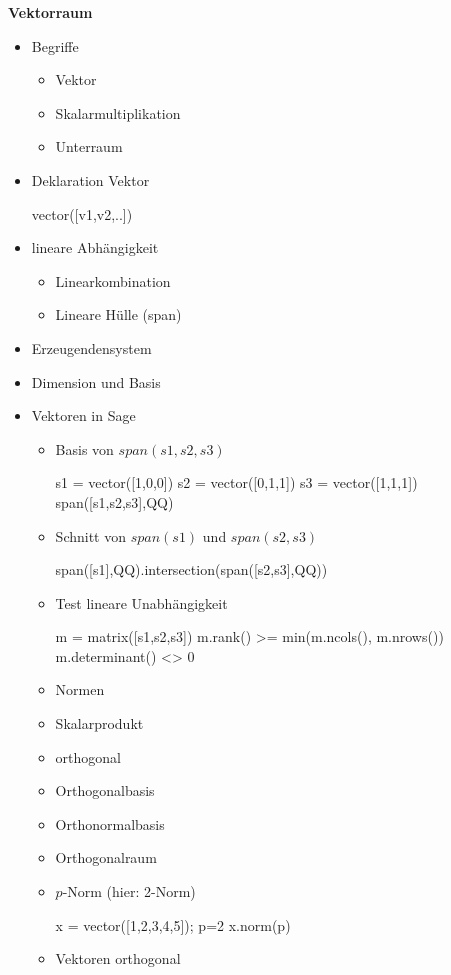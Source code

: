 \documentclass[a4paper,9pt,DIV15,twocolumn]{scrartcl}
\begin{document}
\textbf{Vektorraum}

\begin{itemize}
 \item Begriffe
\begin{itemize}
 \item Vektor
 \item Skalarmultiplikation
 \item Unterraum
\end{itemize}

 \item Deklaration Vektor
\begin{sagein}
vector([v1,v2,..]) 
\end{sagein}
\item lineare Abhängigkeit
\begin{itemize}
 \item Linearkombination
 \item Lineare Hülle (span)
\end{itemize}
\item Erzeugendensystem
\item Dimension und Basis
\item Vektoren in Sage
\begin{itemize}
 \item Basis von $span(s1,s2,s3)$
\begin{sagein}
s1 = vector([1,0,0])
s2 = vector([0,1,1])
s3 = vector([1,1,1])
span([s1,s2,s3],QQ)
\end{sagein}
\item Schnitt von $span(s1)$ und $span(s2,s3)$
\begin{sagein}
span([s1],QQ).intersection(span([s2,s3],QQ))
\end{sagein}
\item Test lineare Unabhängigkeit
\begin{sagein}
m = matrix([s1,s2,s3])
m.rank() >= min(m.ncols(), m.nrows())
m.determinant() <> 0 
\end{sagein}
\item Normen
\item Skalarprodukt
\item orthogonal
\item Orthogonalbasis
\item Orthonormalbasis
\item Orthogonalraum
\item $p$-Norm (hier: 2-Norm)
\begin{sagein}
x = vector([1,2,3,4,5]); p=2
x.norm(p)
\end{sagein}
\item Vektoren orthogonal

\end{itemize}
\end{itemize}
\end{document}

